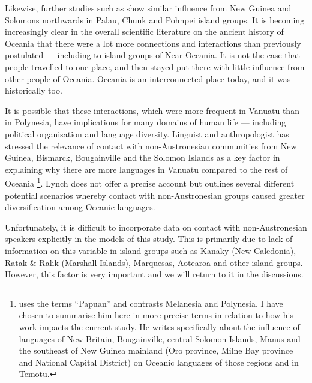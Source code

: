 \documentclass[12pt,letterpaper]{article}
\begin{document}
Likewise, further studies such as \citet{liu2022ancient} show similar influence from New Guinea and Solomons northwards in Palau, Chuuk and Pohnpei island groups. It is becoming increasingly clear in the overall scientific literature on the ancient history of Oceania that there were a lot more connections and interactions than previously postulated --- including to island groups of Near Oceania. It is not the case that people travelled to one place, and then stayed put there with little influence from other people of Oceania. Oceania is an interconnected place today, and it was historically too.

It is possible that these interactions, which were more frequent in Vanuatu than in Polynesia, have implications for many domains of human life --- including political organisation and language diversity. Linguist and anthropologist \citet[104]{lynch1981melanesian} has stressed the relevance of contact with non-Austronesian communities from New Guinea, Bismarck, Bougainville and the Solomon Islands as a key factor in explaining why there are more languages in Vanuatu compared to the rest of Oceania \footnote{\citet{lynch1981melanesian} uses the terms ``Papuan'' and contrasts Melanesia and Polynesia. I have chosen to summarise him here in more precise terms in relation to how his work impacts the current study. He writes specifically about the influence of languages of New Britain, Bougainville, central Solomon Islands, Manus and the southeast of New Guinea mainland (Oro province, Milne Bay province and National Capital District) on Oceanic languages of those regions and in Temotu.}. Lynch does not offer a precise account but outlines several different potential scenarios whereby contact with non-Austronesian groups caused greater diversification among Oceanic languages.

Unfortunately, it is difficult to incorporate data on contact with non-Austronesian speakers explicitly in the models of this study. This is primarily due to lack of information on this variable in island groups such as Kanaky (New Caledonia), Ratak \& Ralik (Marshall Islands), Marquesas, Aotearoa and other island groups. However, this factor is very important and we will return to it in the discussions.

\end{document}
